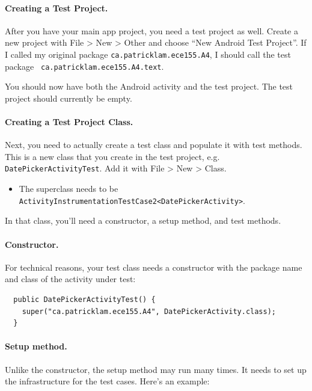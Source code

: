 \paragraph{Creating a Test Project.} 
After you have your main app project, you need a test project as well.
Create a new project with File \textgreater\- New \textgreater\- Other
and choose ``New Android Test Project''. If I called my original package
{\tt ca.patricklam.ece155.A4}, I should call the test package {\tt
ca.patricklam.ece155.A4.text}.

You should now have both the Android activity and the test project. The
test project should currently be empty.

\paragraph{Creating a Test Project Class.} 
Next, you need to actually create a test class and populate it with
test methods.  This is a new class that you create in the test
project, e.g. {\tt DatePickerActivityTest}.  Add it with File
\textgreater\- New \textgreater\- Class.  

\begin{itemize}
\item The superclass needs to be \verb+ActivityInstrumentationTestCase2<DatePickerActivity>+.
\end{itemize}

In that class, you'll need a
constructor, a setup method, and test methods.

\paragraph{Constructor.} For technical reasons, your test class needs a constructor with the
package name and class of the activity under test:

{\small
\begin{verbatim}
  public DatePickerActivityTest() {
    super("ca.patricklam.ece155.A4", DatePickerActivity.class);
  }
\end{verbatim}
}

\paragraph{Setup method.} Unlike the constructor, the setup method may run many times.
It needs to set up the infrastructure for the test cases. Here's an example:

